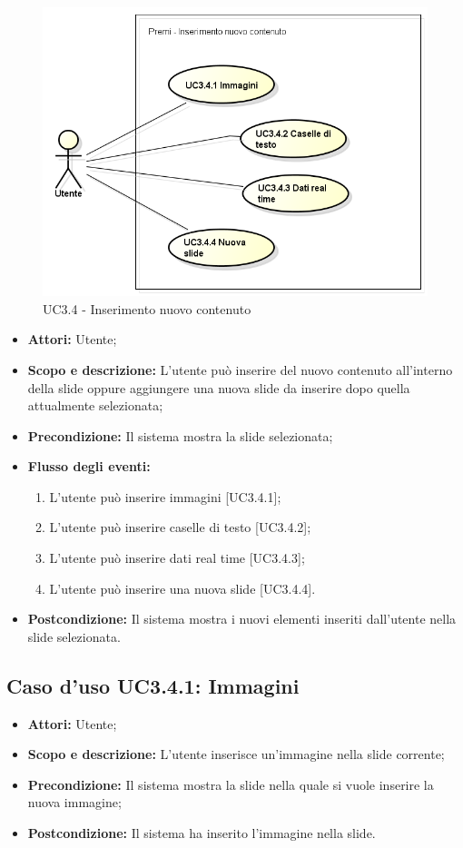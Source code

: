 \begin{figure}[h] 
	\centering 
	\includegraphics[scale=0.45] {img/UC3.4.png} 
	\caption{UC3.4 - Inserimento nuovo contenuto} 
\end{figure}


\begin{itemize}
	\item \textbf{Attori:} Utente;
	\item \textbf{Scopo e descrizione:} L'utente può inserire del nuovo contenuto all'interno della slide oppure aggiungere una nuova slide da inserire dopo quella attualmente selezionata;
	\item \textbf{Precondizione:} Il sistema mostra la slide selezionata;
	\item \textbf{Flusso degli eventi:}
	\begin{enumerate}
		\item L'utente può inserire immagini [UC3.4.1];
		\item L'utente può inserire caselle di testo [UC3.4.2];
		\item L'utente può inserire dati \gls{real time} [UC3.4.3];
		\item L'utente può inserire una nuova slide [UC3.4.4].
	\end{enumerate}
	\item \textbf{Postcondizione:} Il sistema mostra i nuovi elementi inseriti dall'utente nella slide selezionata.
\end{itemize}


\subsection{Caso d'uso UC3.4.1: Immagini}
\begin{itemize}
	\item \textbf{Attori:} Utente;
	\item \textbf{Scopo e descrizione:} L'utente inserisce un'immagine nella slide corrente;
	\item \textbf{Precondizione:} Il sistema mostra la slide nella quale si vuole inserire la nuova immagine;
	\item \textbf{Postcondizione:} Il sistema ha inserito l'immagine nella slide.
\end{itemize}

